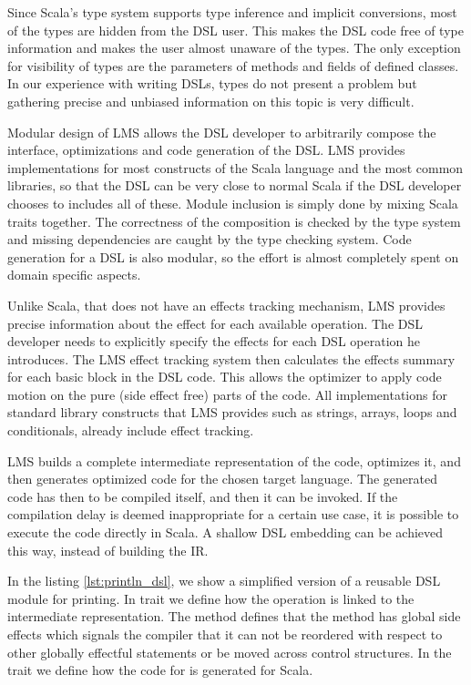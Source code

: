 Since Scala's type system supports type inference and implicit conversions, most of the  types are hidden from the DSL user. This makes the DSL code free of type information and makes the user almost unaware of the  types. The only exception for visibility of  types are the parameters of methods and fields of defined classes. In our experience with writing DSLs,  types do not present a problem but gathering precise and unbiased information on this topic is very difficult.  

Modular design of LMS allows the DSL developer to arbitrarily compose the interface, optimizations and code generation of the DSL. LMS provides implementations for most constructs of the Scala language and the most common libraries, so that the DSL can be very close to normal Scala if the DSL developer chooses to includes all of these. Module inclusion is simply done by mixing Scala traits together. The correctness of the composition is checked by the type system and missing dependencies are caught by the type checking system. Code generation for a DSL is also modular, so the effort is almost completely spent on domain specific aspects.

Unlike Scala, that does not have an effects tracking mechanism, LMS provides precise information about the effect for each available operation. The DSL developer needs to explicitly specify the effects for each DSL operation he introduces. The LMS effect tracking system then calculates the effects summary for each basic block in the DSL code. This allows the optimizer to apply code motion on the pure (side effect free) parts of the code. All implementations for standard library constructs that LMS provides such as strings, arrays, loops and conditionals, already include effect tracking.

LMS builds a complete intermediate representation of the code, optimizes it, and then generates optimized code for the chosen target language. The generated code has then to be compiled itself, and then it can be invoked. If the compilation delay is deemed inappropriate for a certain use case, it is possible to execute the code directly in Scala. A shallow DSL embedding can be achieved this way, instead of building the IR.
 
In the listing \ref{lst:println_dsl}, we show a simplified version of a reusable DSL module for printing. In trait  we define how the  operation is linked to the intermediate representation. The  method defines that the  method has global side effects which signals the compiler that it can not be reordered with respect to other globally effectful statements or be moved across control structures. In the  trait we define how the code for  is generated for Scala. 

